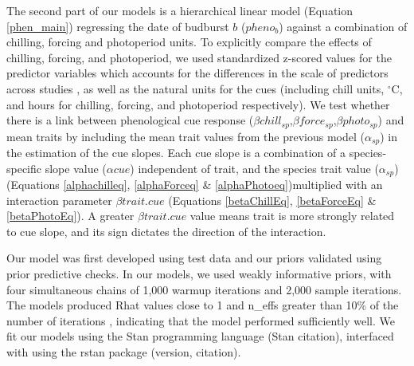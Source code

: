 \documentclass{article}\usepackage[]{graphicx}\usepackage[]{color}
\begin{document}
The second part of our models is a hierarchical linear model (Equation \ref{phen_main}) regressing the date of budburst $b$  ($pheno_{b}$) against a combination of chilling, forcing and photoperiod units. To explicitly compare the effects of chilling, forcing, and photoperiod, we used standardized z-scored values for the predictor variables which accounts for the differences in the scale of predictors across studies \citep{Gelman2006}, as well as the natural units for the cues (including chill units, $^\circ$C, and hours for chilling, forcing, and photoperiod respectively). We test whether there is a link between phenological cue response ($\beta chill_{sp}$,$\beta force_{sp}$,$\beta photo_{sp}$) and mean traits by including the mean trait values from the previous model ($\alpha_{sp}$) in the estimation of the cue slopes. Each cue slope is a combination of a species-specific slope value ($\alpha cue$) independent of trait, and the species trait value ($\alpha_{sp}$) (Equations \ref{alphachilleq}, \ref{alphaForceq} \& \ref{alphaPhotoeq})multiplied with an interaction parameter $\beta trait.cue$ (Equations \ref{betaChillEq}, \ref{betaForceEq} \& \ref{betaPhotoEq}). A greater $\beta trait.cue$ value means trait is more strongly related to cue slope, and its sign dictates the direction of the interaction. 

Our model was first developed using test data and our priors validated using prior predictive checks. In our models, we used weakly informative priors, with four simultaneous chains of 1,000 warmup iterations and 2,000 sample iterations. The models produced Rhat values close to 1 and n\_effs greater than 10\% of the number of iterations %
, indicating that the model performed sufficiently well.  We fit our models using the Stan programming language (Stan citation), interfaced with using the rstan package (version, citation).


 
\end{document}
